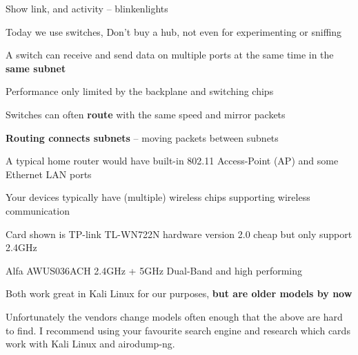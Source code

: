 \documentclass[Screen16to9,17pt]{foils}
\begin{document}


\centerline{Show link, and activity -- blinkenlights}






\begin{list2}
\item Today we use switches, Don't buy a hub, not even for experimenting or sniffing
\item A switch can receive and send data on multiple ports at the same time in the \textbf{same subnet}
\item Performance only limited by the backplane and switching chips
\item Switches can often \textbf{route} with the same speed and mirror packets
\item \textbf{Routing connects subnets} -- moving packets between subnets
\end{list2}




\begin{list1}
\item A typical home router would have built-in 802.11 Access-Point (AP) and some Ethernet LAN ports
\end{list1}




\begin{list2}
\item Your devices typically have (multiple) wireless chips supporting wireless communication
\item Card shown is TP-link TL-WN722N hardware version 2.0 cheap but only support 2.4GHz
\item Alfa AWUS036ACH 2.4GHz + 5GHz Dual-Band and high performing
\item Both work great in Kali Linux for our purposes, {\bf but are older models by now}
\end{list2}

Unfortunately the vendors change models often enough that the above are hard to find. I recommend using your favourite search engine and research which cards work with Kali Linux and airodump-ng.
\end{document}
